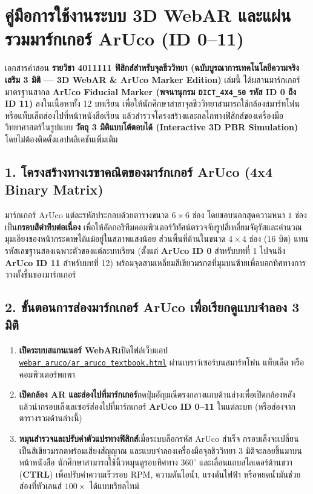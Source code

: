 \chapter*{คู่มือการใช้งานระบบ 3D WebAR และแผ่นรวมมาร์กเกอร์ ArUco (ID 0--11)}

เอกสารคำสอน \textbf{รายวิชา 4011111 ฟิสิกส์สำหรับจุลชีววิทยา (ฉบับบูรณาการเทคโนโลยีความจริงเสริม 3 มิติ — 3D WebAR \& ArUco Marker Edition)} เล่มนี้ ได้ผสานมาร์กเกอร์มาตรฐานสากล \textbf{ArUco Fiducial Marker (พจนานุกรม \texttt{DICT\_4X4\_50} รหัส ID 0 ถึง ID 11)} ลงในเนื้อหาทั้ง 12 บทเรียน เพื่อให้นักศึกษาสาขาจุลชีววิทยาสามารถใช้กล้องสมาร์ทโฟนหรือแท็บเล็ตส่องไปที่หน้าหนังสือเรียน แล้วสำรวจโครงสร้างและกลไกทางฟิสิกส์ของเครื่องมือวิทยาศาสตร์ในรูปแบบ \textbf{วัตถุ 3 มิติแบบโต้ตอบได้ (Interactive 3D PBR Simulation)} โดยไม่ต้องติดตั้งแอปพลิเคชันเพิ่มเติม

\section*{1. โครงสร้างทางเรขาคณิตของมาร์กเกอร์ ArUco (4x4 Binary Matrix)}
มาร์กเกอร์ ArUco แต่ละรหัสประกอบด้วยตารางขนาด $6 \times 6$ ช่อง โดยขอบนอกสุดความหนา $1$ ช่องเป็น\textbf{กรอบสีดำทึบต่อเนื่อง} เพื่อให้อัลกอริทึมคอมพิวเตอร์วิทัศน์ตรวจจับรูปสี่เหลี่ยมจัตุรัสและคำนวณมุมเอียงของหน้ากระดาษได้แม้อยู่ในสภาพแสงน้อย ส่วนพื้นที่ด้านในขนาด $4 \times 4$ ช่อง ($16\text{ บิต}$) แทนรหัสเลขฐานสองเฉพาะตัวของแต่ละบทเรียน (ตั้งแต่ \textbf{ArUco ID 0} สำหรับบทที่ 1 ไปจนถึง \textbf{ArUco ID 11} สำหรับบทที่ 12) พร้อมจุดสามเหลี่ยมสีเขียวมรกตที่มุมบนซ้ายเพื่อบอกทิศทางการวางตั้งขึ้นของมาร์กเกอร์

\section*{2. ขั้นตอนการส่องมาร์กเกอร์ ArUco เพื่อเรียกดูแบบจำลอง 3 มิติ}
\begin{enumerate}
    \item \textbf{เปิดระบบสแกนเนอร์ WebAR}\quad เปิดไฟล์เว็บแอป \href{webar_aruco/ar_aruco_textbook.html}{\texttt{webar\_aruco/ar\_aruco\_textbook.html}} ผ่านเบราว์เซอร์บนสมาร์ทโฟน แท็บเล็ต หรือคอมพิวเตอร์พกพา
    \item \textbf{เปิดกล้อง AR และส่องไปที่มาร์กเกอร์}\quad กดปุ่มอัญมณีตรงกลางแถบด้านล่างเพื่อเปิดกล้องหลัง แล้วนำกรอบเล็งเลเซอร์ส่องไปที่มาร์กเกอร์ \textbf{ArUco ID 0--11} ในแต่ละบท (หรือส่องจากตารางรวมด้านล่างนี้)
    \item \textbf{หมุนสำรวจและปรับค่าตัวแปรทางฟิสิกส์}\quad เมื่อระบบล็อกรหัส ArUco สำเร็จ กรอบเล็งจะเปลี่ยนเป็นสีเขียวมรกตพร้อมเสียงสัญญาณ และแบบจำลองเครื่องมือจุลชีววิทยา 3 มิติจะลอยขึ้นมาบนหน้าหนังสือ นักศึกษาสามารถใช้นิ้วหมุนดูรอบทิศทาง $360^\circ$ และเลื่อนแถบสไลเดอร์ด้านขวา (\textbf{CTRL}) เพื่อปรับค่าความเร็วรอบ $\text{RPM}$, ความดันไอน้ำ, แรงดันไฟฟ้า หรือหยดน้ำมันช่วยส่องที่หัวเลนส์ $100\times$ ได้แบบเรียลไทม์
\end{enumerate}

